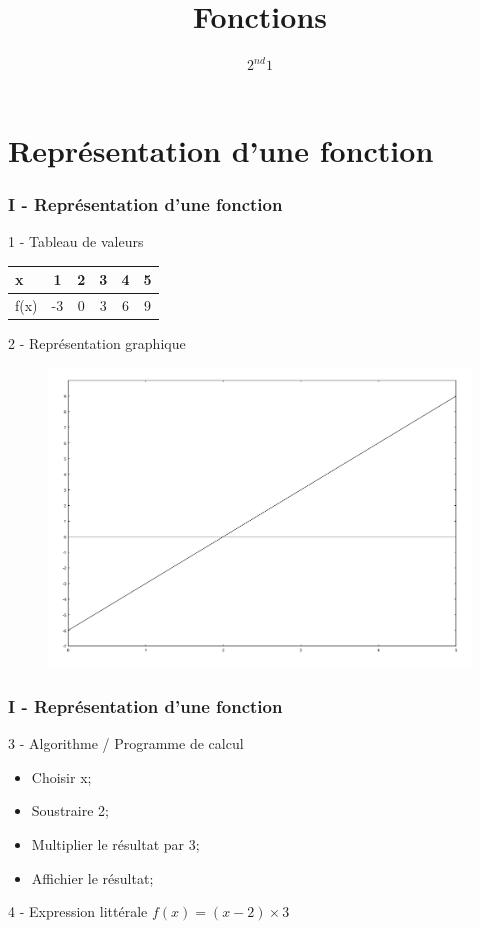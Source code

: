 \documentclass{beamer}
\title{Fonctions}
\author{$2^{nd}1$}
\begin{document}
\frame{\titlepage}

\section{Représentation d'une fonction}

\begin{frame}
  \frametitle{I - Représentation d'une fonction}

  \begin{block}{1 - Tableau de valeurs}	

    \begin{center}
      \begin{tabular}{| l || c | c | c | c | c |}
        \hline			
        x    &  1 & 2 & 3 & 4 & 5\\
        \hline  
        f(x) & -3 & 0 & 3 & 6 & 9\\
        \hline  
      \end{tabular}
    \end{center}

  \end{block}

  \begin{block}{2 - Représentation graphique}
    \begin{figure}[H]
      \centering
      \includegraphics[width=0.6\linewidth]{sources/cours/droite.pdf}
    \end{figure}
  \end{block}

\end{frame}

\begin{frame}
  \frametitle{I - Représentation d'une fonction}

  \begin{block}{3 - Algorithme / Programme de calcul}	
    \begin{itemize}
    \item Choisir x;\\
    \item Soustraire 2;\\
    \item Multiplier le résultat par 3;\\
    \item Affichier le résultat;
    \end{itemize}
  \end{block}

  \begin{alertblock}{4 - Expression littérale}
    $f(x) = (x - 2) \times 3 $
  \end{alertblock}

\end{frame}
\end{document}
